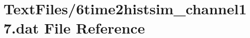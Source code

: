 \hypertarget{6time2histsim__channel17_8dat}{}\section{Text\+Files/6time2histsim\+\_\+channel17.dat File Reference}
\label{6time2histsim__channel17_8dat}
